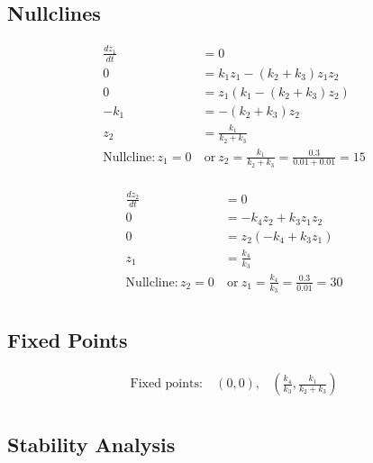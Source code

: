 \documentclass[]{scrartcl}
\begin{document}
\subsection*{Nullclines}

\begin{center}
\noindent \begin{minipage}{.45\linewidth}
\begin{align*}
	\frac{dz_1}{dt} & = 0 \\
	0 & = k_1 z_1 - (k_2 + k_3) z_1 z_2 \\
	0 & = z_1 (k_1 - (k_2 + k_3) z_2) \\
	- k_1 & = - (k_2 + k_3) z_2 \\
	z_2 & = \frac{k_1}{k_2 + k_3} \\
	\textrm{Nullcline}: z_1 = 0 & ~ \textrm{or} ~ z_2 = \frac{k_1}{k_2 + k_3} = \frac{0.3}{0.01 + 0.01} = 15 \\
\end{align*}
\end{minipage}
\noindent \begin{minipage}{.45\linewidth}
\begin{align*}
	\frac{dz_2}{dt} & = 0 \\
	0 & = - k_4 z_2 + k_3 z_1 z_2 \\
	0 & = z_2 (- k_4 + k_3 z_1) \\
	z_1 & = \frac{k_4}{k_3} \\
	\textrm{Nullcline}: z_2 = 0 & ~ \textrm{or} ~ z_1 = \frac{k_4}{k_3} = \frac{0.3}{0.01} = 30 \\
\end{align*}
\end{minipage}
\end{center}

\subsection*{Fixed Points}

\begin{center}
\noindent \begin{minipage}{.45\linewidth}
\begin{align*}
	\textrm{Fixed points:} ~ & (0,0), & \left( \frac{k_4}{k_3} , \frac{k_1}{k_2 + k_3} \right) \\
\end{align*}
\end{minipage}
\end{center}


\subsection*{Stability Analysis}
\end{document}
